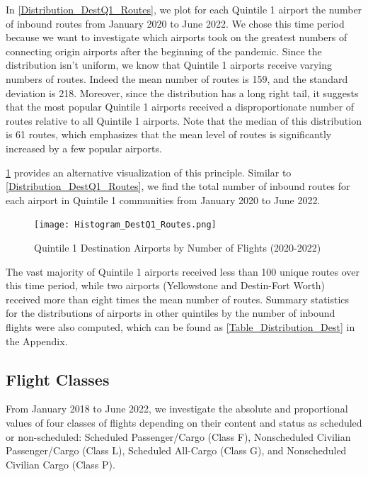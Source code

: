 \documentclass[11pt]{article}
\begin{document}
In \cref{Distribution_DestQ1_Routes}, we plot for each Quintile 1 airport the number of inbound routes from January 2020 to June 2022. We chose this time period because we want to investigate which airports took on the greatest numbers of connecting origin airports after the beginning of the pandemic. Since the distribution isn't uniform, we know that Quintile 1 airports receive varying numbers of routes. Indeed the mean number of routes is 159, and the standard deviation is 218. Moreover, since the distribution has a long right tail, it suggests that the most popular Quintile 1 airports received a disproportionate number of routes relative to all Quintile 1 airports. Note that the median of this distribution is 61 routes, which emphasizes that the mean level of routes is significantly increased by a few popular airports.

\-\hspace{0.5cm} \cref{Histogram_DestQ1_Routes} provides an alternative visualization of this principle. Similar to \cref{Distribution_DestQ1_Routes}, we find the total number of inbound routes for each airport in Quintile 1 communities from January 2020 to June 2022.

\begin{figure}[htbp]
\centerline{\texttt{[image: Histogram\_DestQ1\_Routes.png]}}
\caption{Quintile 1 Destination Airports by Number of Flights (2020-2022)}
\label{Histogram_DestQ1_Routes}
\end{figure}

The vast majority of Quintile 1 airports received less than 100 unique routes over this time period, while two airports (Yellowstone and Destin-Fort Worth) received more than eight times the mean number of routes. Summary statistics for the distributions of airports in other quintiles by the number of inbound flights were also computed, which can be found as \cref{Table_Distribution_Dest} in the Appendix.

\subsection{Flight Classes}

From January 2018 to June 2022, we investigate the absolute and proportional values of four classes of flights depending on their content and status as scheduled or non-scheduled: Scheduled Passenger/Cargo (Class F), Nonscheduled Civilian Passenger/Cargo (Class L), Scheduled All-Cargo (Class G), and Nonscheduled Civilian Cargo (Class P).
\end{document}
